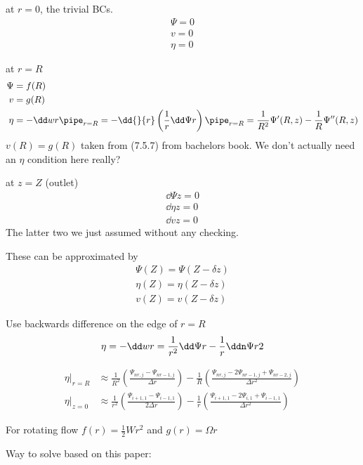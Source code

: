 \documentclass{X:/Documents/Coding/Latex/myreport}
\begin{document}
at $r=0$, the trivial BCs.
\begin{align*}
    \Psi= 0\\
    v = 0\\
    \eta = 0
\end{align*}


at $r= R$
\begin{align*}
    \Psi &= f(R)\\
    v &= g(R)\\
    \eta &= - \dd wr\pipe_{r=R}  = -\dd{}{r}\left(\frac{1}{r} \dd \Psi r\right)\pipe_{r=R}= \frac{1}{R^2} \Psi'(R,z) - \frac1R \Psi''(R,z)
\end{align*}
$v(R) = g(R)$ taken from (7.5.7) from bachelors book.
We don't actually need an $\eta$ condition here really?




at $z=Z$ (outlet)
\begin{align*}
    \dd\Psi z = 0\\
    \dd \eta z = 0\\
    \dd vz = 0 
\end{align*}
The latter two we just assumed without any checking.

These can be approximated by
\begin{align*}
    \Psi(Z) = \Psi(Z- \delta z)\\
    \eta(Z) = \eta(Z -\delta z)\\
    v(Z) = v(Z - \delta z)
\end{align*}

Use backwards difference on the edge of $r=R$ 
\[\eta = - \dd wr =  \frac{1}{r^2} \dd\Psi r - \frac1r \ddn \Psi r 2\]


\begin{align*}
    \eta|_{r=R} &\approx \frac{1}{R^2}\left(\frac{\Psi_{nr,j} - \Psi_{nr-1,j}}{\Delta r}\right) - \frac{1}{R} \left(\frac{\Psi_{nr,j} - 2\Psi_{nr-1,j} + \Psi_{nr-2,j}}{\Delta r^2}\right) \\
    \eta|_{z=0} &\approx  \frac{1}{r^2} \left(\frac{\Psi_{i+1,1} - \Psi_{i-1,1}}{2\Delta r}\right) - \frac{1}{r} \left(\frac{\Psi_{i+1,1} - 2 \Psi_{i,1} + \Psi_{i-1,1}}{\Delta r^2}\right)
\end{align*}




For rotating flow $f(r) = \frac12 W r^2$ and $g(r) = \Omega r$


Way to solve based on this paper:
\end{document}
